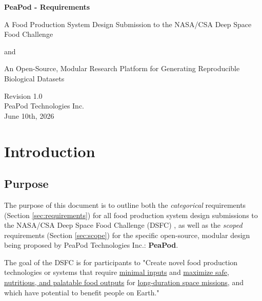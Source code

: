\documentclass{../tex/report}
\begin{document}
\begin{titlepage}
    \begin{center}
        \vspace*{1.2cm}

        \textbf{\large{PeaPod - Requirements}}

        \vspace{0.5cm}

        A Food Production System Design Submission to the NASA/CSA Deep Space Food Challenge

        and

        An Open-Source, Modular Research Platform for Generating Reproducible Biological Datasets

        \vfill
        
        \vspace{1.25cm}

        Revision 1.0\\
        PeaPod Technologies Inc.\\
        June 10th, 2026

    \end{center}
\end{titlepage}

\thispagestyle{plain}

\tableofcontents
\clearpage

\section{Introduction}
\label{sec:intro}

\subsection{Purpose}
\label{sec:purpose}

\hspace{24pt} The purpose of this document is to outline both the \textit{categorical} requirements (Section \ref{sec:requirements}) for all food production system design submissions to the NASA/CSA Deep Space Food Challenge (DSFC) \cite{dsfc}, as well as the \textit{scoped} requirements (Section \ref{sec:scope}) for the specific open-source, modular design being proposed by PeaPod Technologies Inc.: \textbf{PeaPod}.

\hspace{24pt} The goal of the DSFC is for participants to "Create novel food production technologies or systems that require \uline{minimal inputs} and \uline{maximize safe, nutritious, and palatable food outputs} for \uline{long-duration space missions}, and which have potential to benefit people on Earth." \cite{applicantguide}
\end{document}
